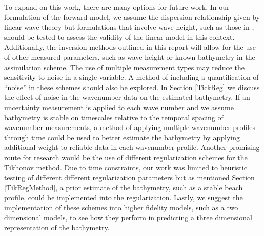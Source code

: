 To expand on this work, there are many options for future work. In our formulation of the forward model, we assume the dispersion relationship given by linear wave theory but formulations that involve wave height, such as those in \cite{Catalan2008}, should be tested to assess the validity of the linear model in this context. Additionally, the inversion methods outlined in this report will allow for the use of other measured parameters, such as wave height or known bathymetry in the assimilation scheme. The use of multiple measurement types may reduce the sensitivity to noise in a single variable. A method of including a quantification of ``noise'' in these schemes should also be explored. In Section \ref{TickReg} we discuss the effect of noise in the wavenumber data on the estimated bathymetry. If an uncertainty measurement is applied to each wave number and we assume bathymetry is stable on timescales relative to the temporal spacing of wavenumber measurements, a method of applying multiple wavenumber profiles through time could be used to better estimate the bathymetry by applying additional weight to reliable data in each wavenumber profile. Another promising route for research would be the use of different regularization schemes for the Tikhonov method. Due to time constraints, our work was limited to heuristic testing of different different regularization parameters but as mentioned Section \ref{TikRegMethod}, a prior estimate of the bathymetry, such as a stable beach profile, could be implemented into the regularization. Lastly, we suggest the implementation of these schemes into higher fidelity models, such as a two dimensional models, to see how they perform in predicting a three dimensional representation of the bathymetry.
